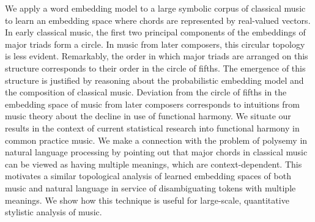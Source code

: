 
We apply a word embedding model to a large symbolic corpus of classical music to learn an embedding space where chords are represented by real-valued vectors.
In early classical music, the first two principal components of the embeddings of major triads form a circle. In music from later composers, this circular topology is less evident. Remarkably, the order in which major triads are arranged on this structure corresponds to their order in the circle of fifths.
The emergence of this structure is justified by reasoning about the probabilistic embedding model and the composition of classical music. Deviation from the circle of fifths in the embedding space of music from later composers corresponds to intuitions from music theory about the decline in use of functional harmony.
We situate our results in the context of current statistical research into functional harmony in common practice music. We make a connection with the problem of polysemy in natural language processing by pointing out that major chords in classical music can be viewed as having multiple meanings, which are context-dependent. This motivates a similar topological analysis of learned embedding spaces of both music and natural language in service of disambiguating tokens with multiple meanings. We show how this technique is useful for large-scale, quantitative stylistic analysis of music.
